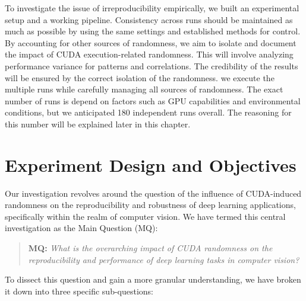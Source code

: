 To investigate the issue of irreproducibility empirically, we built an experimental setup and a working pipeline. Consistency across runs should be maintained as much as
possible by using the same settings and established methods for control. By accounting for other sources of randomness,
we aim to isolate and document the impact of CUDA execution-related randomness. 
This will involve analyzing performance variance for patterns and correlations. The credibility of the results will be ensured by the correct isolation of the randomness.
we execute the multiple runs while carefully managing all sources of randomness. 
The exact number of runs is depend on factors such as GPU capabilities and environmental conditions, 
but we anticipated 180 independent runs overall. The reasoning for this number will be explained later in this chapter.

\section{Experiment Design and Objectives}
Our investigation revolves around the question of the influence of CUDA-induced randomness on the reproducibility and robustness of deep learning applications, specifically within the realm of computer vision. We have termed this central investigation as the Main Question (MQ):

\begin{quote}
\textbf{MQ:} \textit{What is the overarching impact of CUDA randomness on the reproducibility and performance of deep learning tasks in computer vision?}
\end{quote}

To dissect this question and gain a more granular understanding, we have broken it down into three specific sub-questions:

